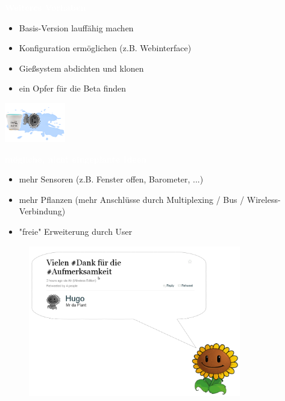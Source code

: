 \documentclass[bigger]{beamer}
\newcommand{\topic}[1]{{\huge{\textcolor{white}{\textbf{#1}}}}}
\begin{document}
\begin{frame}{\topic{Weiteres Vorhaben}}
	\begin{itemize}
		\item Basis-Version lauffähig machen
		\item Konfiguration ermöglichen (z.B. Webinterface)
		\item Gießsystem abdichten und klonen
		\item ein Opfer für die Beta finden
	\end{itemize}
	\begin{flushright}
		\includegraphics[width=100px]{bloody2.png}
	\end{flushright}

\end{frame}


\begin{frame}{\topic{mögliche, nicht eingeplante Ideen}}
	\begin{itemize}
		\item mehr Sensoren (z.B. Fenster offen, Barometer, ...)
		\item mehr Pflanzen (mehr Anschlüsse durch Multiplexing / Bus / Wireless-Verbindung)
		\item "freie" Erweiterung durch User
	\end{itemize}
\end{frame}


{
%
\begin{frame}{}
	\begin{figure}[H]
		\includegraphics[width=350px]{Danke.png}
	\end{figure}
\end{frame}
}
\end{document}
